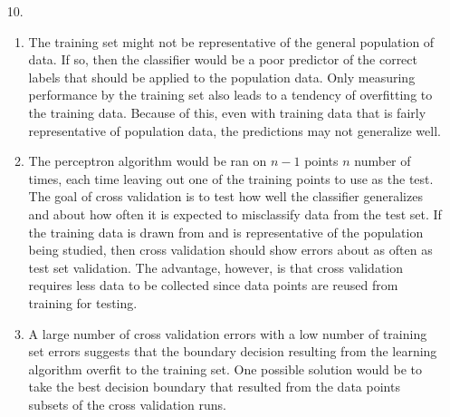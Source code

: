 \documentclass{article}
\begin{document}
\begin{enumerate}
\bigskip

\item[10.]
	\begin{enumerate}
	\item 
		  The training set might not be representative of the general population of data. If so, then the classifier would be a poor predictor of the correct labels that should be applied to the population data.
		  \newline\newline
		  Only measuring performance by the training set also leads to a tendency of overfitting to the training data. Because of this, even with training data that is fairly representative of population data, the predictions may not generalize well.
	\item 
		  The perceptron algorithm would be ran on $n-1$ points $n$ number of times, each time leaving out one of the training points to use as the test. The goal of cross validation is to test how well the classifier generalizes and about how often it is expected to misclassify data from the test set. If the training data is drawn from and is representative of the population being studied, then cross validation should show errors about as often as test set validation. The advantage, however, is that cross validation requires less data to be collected since data points are reused from training for testing. 
	\item 
		  A large number of cross validation errors with a low number of training set errors suggests that the boundary decision resulting from the learning algorithm overfit to the training set. One possible solution would be to take the best decision boundary that resulted from the data points subsets of the cross validation runs. 
	\end{enumerate}

\end{enumerate}
\end{document}
